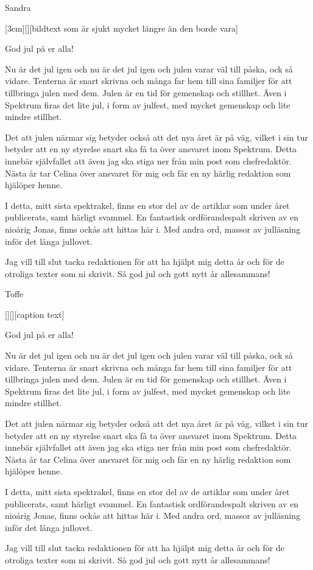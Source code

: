 \documentclass{spektraklet}
\begin{document}
\begin{ledaren}{Sandra}

[3cm][][bildtext som är sjukt mycket längre än den borde vara]

God jul på er alla!

Nu är det jul igen och nu är det jul igen och julen varar väl till påska, ock så vidare. Tenterna är snart skrivna och många far hem till sina familjer för att tillbringa julen med dem. Julen är en tid för gemenskap och stillhet. Även i Spektrum firas det lite jul, i form av julfest, med mycket gemenskap och lite mindre stillhet.

Det att julen närmar sig betyder också att det nya året är på väg, vilket i sin tur betyder att en ny styrelse snart ska få ta över ansvaret inom Spektrum. Detta innebär självfallet att även jag ska stiga ner från min post som chefredaktör. Nästa år tar Celina över ansvaret för mig och får en ny härlig redaktion som hjälöper henne.

I detta, mitt sista spektrakel, finns en stor del av de artiklar som under året publicerats, samt härligt svammel. En fantastisk ordförandespalt skriven av en nioårig Jonas, finns ockås att hittas här i. Med andra ord, massor av julläsning inför det långa jullovet.

Jag vill till slut tacka redaktionen för att ha hjälpt mig detta år och för de otroliga texter som ni skrivit. Så god jul och gott nytt år allesammans!

\end{ledaren}




\begin{ordforandespalten}{Toffe}

[][][caption text]

God jul på er alla!

Nu är det jul igen och nu är det jul igen och julen varar väl till påska, ock så vidare. Tenterna är snart skrivna och många far hem till sina familjer för att tillbringa julen med dem. Julen är en tid för gemenskap och stillhet. Även i Spektrum firas det lite jul, i form av julfest, med mycket gemenskap och lite mindre stillhet.

Det att julen närmar sig betyder också att det nya året är på väg, vilket i sin tur betyder att en ny styrelse snart ska få ta över ansvaret inom Spektrum. Detta innebär självfallet att även jag ska stiga ner från min post som chefredaktör. Nästa år tar Celina över ansvaret för mig och får en ny härlig redaktion som hjälöper henne.

I detta, mitt sista spektrakel, finns en stor del av de artiklar som under året publicerats, samt härligt svammel. En fantastisk ordförandespalt skriven av en nioårig Jonas, finns ockås att hittas här i. Med andra ord, massor av julläsning inför det långa jullovet.

Jag vill till slut tacka redaktionen för att ha hjälpt mig detta år och för de otroliga texter som ni skrivit. Så god jul och gott nytt år allesammans!
	
\end{ordforandespalten}
\end{document}
